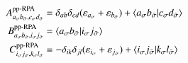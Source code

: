\documentclass[aip,jcp,reprint,noshowkeys,superscriptaddress]{revtex4-1}
\newcommand{\ppRPA}{\text{pp-RPA}}
\newcommand{\e}[1]{\eps_{#1}}
\newcommand{\bO}{\mathbf{0}}
\newcommand{\bA}[2]{\mathbf{A}_{#1}^{#2}}
\newcommand{\bB}[2]{\mathbf{B}_{#1}^{#2}}
\newcommand{\eps}{\varepsilon}
\newcommand{\sig}{\sigma}
\newcommand{\bsig}{{\Bar{\sigma}}}
\newcommand{\upup}{\uparrow\uparrow}
\newcommand{\updw}{\uparrow\downarrow}
\newcommand{\dwup}{\downarrow\uparrow}
\newcommand{\dwdw}{\downarrow\downarrow}
\newcommand{\spc}{\text{sc}}
\newcommand{\spf}{\text{sf}}
\begin{document}
\begin{subequations}
\begin{align}
	A_{a_\sig b_\bsig,c_\sig d_\bsig}^{\ppRPA} & = \delta_{ab} \delta_{cd} (\e{a_\sig} + \e{b_\bsig}) + \braket{a_\sig b_\bsig}{c_\sig d_\bsig}
	\\ 
	B_{a_\sig b_\bsig,i_\sig j_\bsig}^{\ppRPA} & = \braket{a_\sig b_\bsig }{i_\sig j_\bsig}
	\\ 
	C_{i_\sig j_\bsig,k_\sig l_\bsig}^{\ppRPA} & = - \delta_{ik} \delta_{jl} (\e{i_\sig} + \e{j_\bsig}) + \braket{i_\sig j_\bsig}{k_\sig l_\bsig}
\end{align}
\end{subequations}



\end{document}
